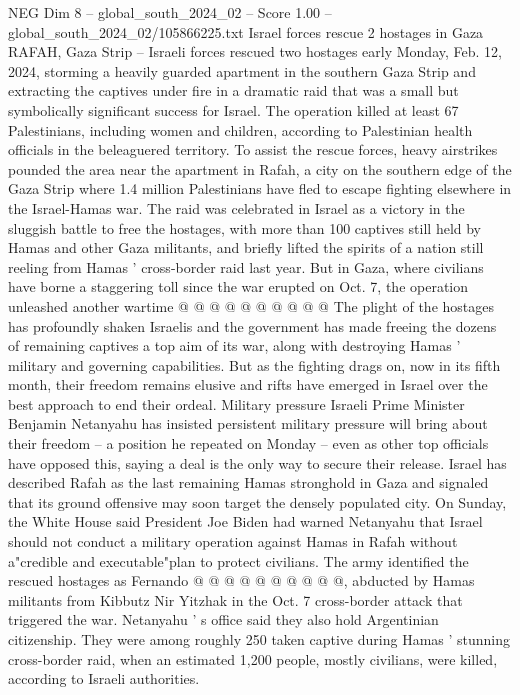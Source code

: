 \begin{textsample}{NEG Dim 8 – global\_south\_2024\_02 – Score 1.00 – global\_south\_2024\_02/105866225.txt}  \label{ex:f8_neg_259}
Israel forces rescue 2 hostages in Gaza RAFAH, Gaza Strip -- Israeli forces rescued two hostages early Monday, Feb. 12, 2024, storming a heavily guarded apartment in the southern Gaza Strip and extracting the captives under fire in a dramatic raid that was a small but symbolically significant success for Israel.
The operation killed at least 67 Palestinians, including women and children, according to Palestinian health officials in the beleaguered territory.
To assist the rescue forces, heavy airstrikes pounded the area near the apartment in Rafah, a city on the southern edge of the Gaza Strip where 1.4 million Palestinians have fled to escape fighting elsewhere in the Israel-Hamas war.
The raid was celebrated in Israel as a victory in the sluggish battle to free the hostages, with more than 100 captives still held by Hamas and other Gaza militants, and briefly lifted the spirits of a nation still reeling from Hamas ' cross-border raid last year.
But in Gaza, where civilians have borne a staggering toll since the war erupted on Oct. 7, the operation unleashed another wartime @ @ @ @ @ @ @ @ @ @ The plight of the hostages has profoundly shaken Israelis and the government has made freeing the dozens of remaining captives a top aim of its war, along with destroying Hamas ' military and governing capabilities.
But as the fighting drags on, now in its fifth month, their freedom remains elusive and rifts have emerged in Israel over the best approach to end their ordeal.
Military pressure Israeli Prime Minister Benjamin Netanyahu has insisted persistent military pressure will bring about their freedom -- a position he repeated on Monday -- even as other top officials have opposed this, saying a deal is the only way to secure their release.
Israel has described Rafah as the last remaining Hamas stronghold in Gaza and signaled that its ground offensive may soon target the densely populated city.
On Sunday, the White House said President Joe Biden had warned Netanyahu that Israel should not conduct a military operation against Hamas in Rafah without a"credible and executable"plan to protect civilians.
The army identified the rescued hostages as Fernando @ @ @ @ @ @ @ @ @ @, abducted by Hamas militants from Kibbutz Nir Yitzhak in the Oct. 7 cross-border attack that triggered the war.
Netanyahu ' s office said they also hold Argentinian citizenship.
They were among roughly 250 taken captive during Hamas ' stunning cross-border raid, when an estimated 1,200 people, mostly civilians, were killed, according to Israeli authorities.

\end{textsample}
